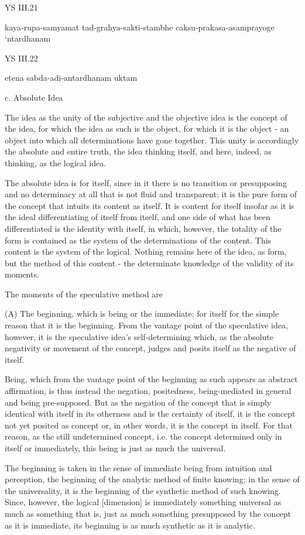 YS III.21

kaya-rupa-samyamat tad-grahya-sakti-stambhe caksu-prakasa-asamprayoge ‘ntardhanam

YS III.22

etena sabda-adi-antardhanam uktam

c. Absolute Idea

The idea as the unity of the subjective and the objective idea is
the concept of the idea, for which the idea as such is the object,
for which it is the object - an object into which all determinations have gone together.
This unity is accordingly the absolute and entire truth,
the idea thinking itself, and here, indeed, as thinking, as the logical idea.

The absolute idea is for itself, since in it there is no transition or presupposing
and no determinacy at all that is not fluid and transparent;
it is the pure form of the concept that intuits its content as itself.
It is content for itself insofar as it is the ideal differentiating of
itself from itself, and one side of what has been differentiated is
the identity with itself, in which, however, the totality of the form is
contained as the system of the determinations of the content.
This content is the system of the logical.
Nothing remains here of the idea, as form, but the method of this content -
the determinate knowledge of the validity of its moments.

The moments of the speculative method are

(A) The beginning, which is being or the immediate;
for itself for the simple reason that it is the beginning.
From the vantage point of the speculative idea, however,
it is the speculative idea's self-determining which,
as the absolute negativity or movement of the concept,
judges and posits itself as the negative of itself.

Being, which from the vantage point of the beginning as such
appears as abstract affirmation, is thus instead the negation,
positedness, being-mediated in general and being pre-supposed.
But as the negation of the concept that is simply identical
with itself in its otherness and is the certainty of itself,
it is the concept not yet posited as concept or, in other words,
it is the concept in itself.
For that reason, as the still undetermined concept,
i.e. the concept determined only in itself or immediately,
this being is just as much the universal.

    The beginning is taken in the sense of immediate being
    from intuition and perception,
    the beginning of the analytic method of finite knowing;
    in the sense of the universality,
    it is the beginning of the synthetic method of such knowing.
    Since, however, the logical [dimension] is immediately something universal
    as much as something that is,
    just as much something presupposed by the concept as it is immediate,
    its beginning is as much synthetic as it is analytic.



